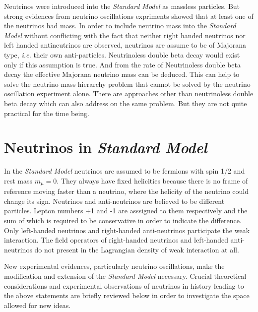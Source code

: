 Neutrinos were introduced into the \emph{Standard Model} as massless
particles. But strong evidences from neutrino oscillations expriments
showed that at least one of the neutrinos had mass. In order to
include neutrino mass into the \emph{Standard Model} without
conflicting with the fact that neither right handed neutrinos nor left
handed antineutrinos are observed, neutrinos are assume to be of
Majorana type, \textit{i.e.} their own anti-particles. Neutrinoless
double beta decay would exist only if this assumption is true. And
from the rate of Neutrinoless double beta decay the effective Majorana
neutrino mass can be deduced. This can help to solve the neutrino mass
hierarchy problem that cannot be solved by the neutrino oscillation
experiment alone. There are approaches other than neutrinoless double
beta decay which can also address on the same problem. But they are
not quite practical for the time being.

\section{Neutrinos in \emph{Standard Model}}
\label{sec:sm}
In the \emph{Standard Model} neutrinos are assumed to be fermions with
spin 1/2 and rest mass $m_\mu=0$. They always have fixed helicities
because there is no frame of reference moving faster than a neutrino,
where the helicity of the neutrino could change its sign. Neutrinos
and anti-neutrinos are believed to be different particles. Lepton
numbers +1 and -1 are asssigned to them respectively and the sum of
which is required to be conservative in order to indicate the
difference. Only left-handed neutrinos and right-handed anti-neutrinos
participate the weak interaction. The field operators of right-handed
neutrinos and left-handed anti-neutrinos do not present in the
Lagrangian density of weak interaction at all.

New experimental evidences, particularly neutrino oscillations, make
the modification and extension of the \emph{Standard Model} necessary.
Crucial theoretical considerations and experimental observations of
neutrinos in history leading to the above statements are briefly
reviewed below in order to investigate the space allowed for new
ideas.

